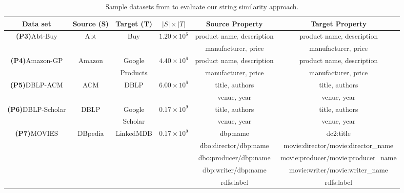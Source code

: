 \begin{table}[htb]
\centering
\caption{Sample datasets from \cite{georgala2018dynamic} to evaluate our string similarity approach.}
\label{tab:TableFmeasure}
\resizebox{1.0\textwidth}{!}
{
\begin{tabular}{*{6}{c}} \hline
    \textbf{Data set}           & \textbf{Source (S)} & \textbf{Target (T)} & \textbf{$|S| \times |T|$} & \textbf{Source Property} & \textbf{Target Property}                           \\ \hline
    
    \textbf{(P3)}Abt-Buy    & Abt & Buy  & $1.20 \times 10^6$ & product name, description                       & product name, description                         \\
                                &&&& manufacturer, price               & manufacturer, price                       \\ \hline
    \textbf{(P4)}Amazon-GP  & Amazon & Google & $4.40 \times 10^6$ & product name, description                 & product name, description                         \\ 
                                && Products && manufacturer, price               & manufacturer, price                       \\ \hline
    \textbf{(P5)}DBLP-ACM  & ACM & DBLP& $6.00 \times 10^6$ & title, authors                    & title, authors                            \\
                                &&&& venue, year                       & venue, year                               \\ \hline
    \textbf{(P6)}DBLP-Scholar& DBLP & Google  & $ 0.17 \times 10^9$ & title, authors                    & title, authors                            \\
                                && Scholar && venue, year                       & venue, year                               \\ \hline
    \textbf{(P7)}MOVIES   & DBpedia & LinkedMDB & $0.17 \times 10^9$ & dbp:name                          & dc2:title     \\
                                &&&& dbo:director/dbp:name             & movie:director/movie:director\_name       \\
                                &&&& dbo:producer/dbp:name             & movie:producer/movie:producer\_name       \\
                                &&&& dbp:writer/dbp:name            & movie:writer/movie:writer\_name           \\
                                &&&& rdfs:label & rdfs:label           \\ 
                                \hline
\end{tabular}
}
\end{table}



